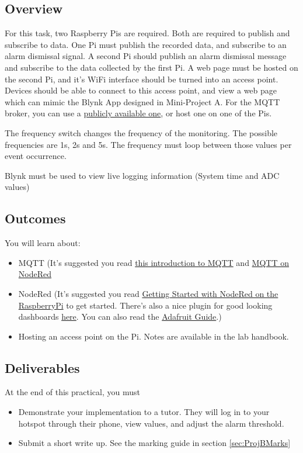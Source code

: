 \subsection{Overview}
For this task, two Raspberry Pis are required. Both are required to publish and subscribe to data. One Pi must publish the recorded data, and subscribe to an alarm dismissal signal. A second Pi should publish an alarm dismissal message and subscribe to the data collected by the first Pi. A web page must be hosted on the second Pi, and it's WiFi interface should be turned into an access point. Devices should be able to connect to this access point, and view a web page which can mimic the Blynk App designed in Mini-Project A. For the MQTT broker, you can use a \href{https://diyprojects.io/8-online-mqtt-brokers-iot-connected-objects-cloud/}{publicly available one}, or host one on one of the Pis.

    \item The frequency switch changes the frequency of the monitoring. The possible frequencies are 1s, 2s and 5s. The frequency must loop between those values per event occurrence.
       \item Blynk must be used to view live logging information (System time and ADC values)

\subsection{Outcomes}
You will learn about:
\begin{itemize}
    \item MQTT (It's suggested you read \href{https://randomnerdtutorials.com/what-is-mqtt-and-how-it-works/}{this introduction to MQTT} and \href{https://cookbook.nodered.org/mqtt/}{MQTT on NodeRed}
    \item NodeRed (It's suggested you read \href{https://nodered.org/docs/getting-started/raspberrypi}{Getting Started with NodeRed on the RaspberryPi} to get started. There's also a nice plugin for good looking dashboards \href{https://flows.nodered.org/node/node-red-dashboard}{here}. You can also read the \href{https://learn.adafruit.com/raspberry-pi-hosting-node-red}{Adafruit Guide}.)
    \item Hosting an access point on the Pi. Notes are available in the lab handbook. 
\end{itemize}

\subsection{Deliverables}
At the end of this practical, you must
\begin{itemize}
    \item Demonstrate your implementation to a tutor. They will log in to your hotspot through their phone, view values, and adjust the alarm threshold.
    \item Submit a short write up. See the marking guide in section \ref{sec:ProjBMarks}
\end{itemize}

